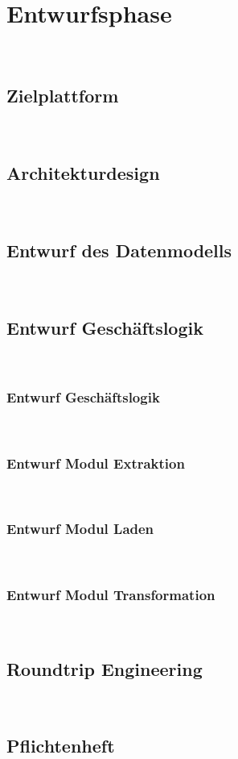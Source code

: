 \documentclass[11pt,toc=sectionentrywithoutdots, 
headheight=44pt, headings=optiontoheadandtoc, hyperfootnotes=false]{scrartcl}
\begin{document}
\section{Entwurfsphase}
\blindtext\

\subsection{Zielplattform}
\blindtext\

\subsection{Architekturdesign}
\blindtext\

\subsection{Entwurf des Datenmodells}
\blindtext\

\subsection{Entwurf Geschäftslogik}
\blindtext\

\subsubsection{Entwurf Geschäftslogik}
\blindtext\

\subsubsection{Entwurf Modul Extraktion}
\blindtext\

\subsubsection{Entwurf Modul Laden}
\blindtext\

\subsubsection{Entwurf Modul Transformation}
\blindtext\

\subsection{Roundtrip Engineering}
\blindtext\

\subsection{Pflichtenheft}
\blindtext\
\end{document}
